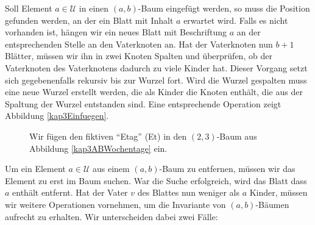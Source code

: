
Soll Element $a \in \mathcal{U}$ in einen $(a,b)$-Baum eingefügt werden, so muss die Position gefunden werden, an der ein Blatt mit Inhalt $a$ erwartet wird. Falls es nicht vorhanden ist, hängen wir ein neues Blatt mit Beschriftung $a$ an der entsprechenden Stelle an den Vaterknoten an. Hat der Vaterknoten nun $b+1$ Blätter, müssen wir ihn in zwei Knoten Spalten und überprüfen, ob der Vaterknoten des Vaterknotens dadurch zu viele Kinder hat. Dieser Vorgang setzt sich gegebenenfalls rekursiv bis zur Wurzel fort. Wird die Wurzel gespalten muss eine neue Wurzel erstellt werden, die als Kinder die Knoten enthält, die aus der Spaltung der Wurzel entstanden sind. Eine entsprechende Operation zeigt Abbildung \vref{kap3Einfuegen}.

\begin{figure}[htbp]
  \centering
  
  
  \caption{Wir fügen den fiktiven "`Etag"' (Et) in den $(2,3)$-Baum aus Abbildung \vref{kap3ABWochentage} ein.}
  \label{kap3Einfuegen}
\end{figure}



Um ein Element $a \in \mathcal{U}$ aus einem $(a,b)$-Baum zu entfernen, müssen wir das Element zu erst im Baum suchen. War die Suche erfolgreich, wird das Blatt dass $a$ enthält entfernt. Hat der Vater $v$ des Blattes nun weniger als $a$ Kinder, müssen wir weitere Operationen vornehmen, um die Invariante von $(a,b)$-Bäumen aufrecht zu erhalten. Wir unterscheiden dabei zwei Fälle:

